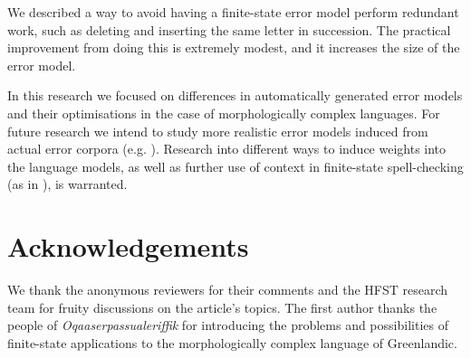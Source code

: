 \documentclass[free]{flammie}
\begin{document}
We described a way to avoid having a finite-state error model perform
redundant work, such as deleting and inserting the same letter in succession.
The practical improvement from doing this is extremely modest, and it increases
the size of the error model.

In this research we focused on differences in automatically generated error
models and their optimisations in the case of morphologically complex languages.
For future research we intend to study more realistic error models induced from
actual error corpora (e.g. \cite{brill/2000}). Research into
different ways to induce weights into the language models, as well as further use
of context in finite-state spell-checking (as in
\cite{pirinen/2012/cicling}), is warranted.

\section*{Acknowledgements} 

We thank the anonymous reviewers for their comments and the HFST research
team for fruity discussions on the article's topics. The first author thanks
the  people of \emph{Oqaaserpassualeriffik} for introducing the problems and 
possibilities of finite-state applications to the morphologically complex
language of Greenlandic.



\end{document}
